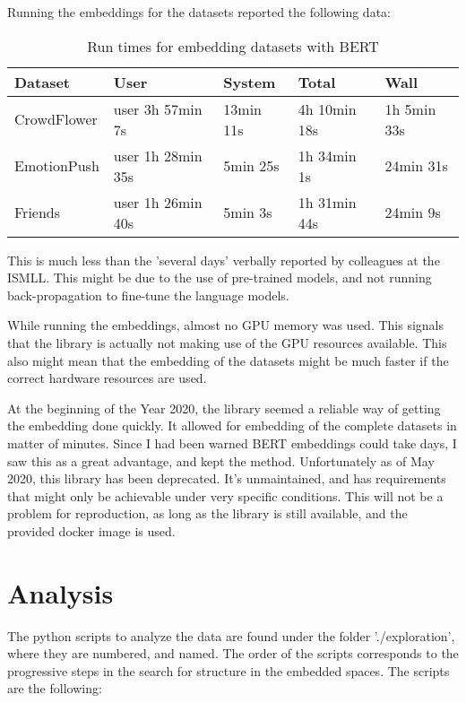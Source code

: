Running the embeddings for the datasets reported the following data:

\begin{table}[H]
  \begin{tabular}{lllll}
  Dataset                          & User              & System    & Total        & Wall        \\
  \hline
  \multicolumn{1}{l|}{CrowdFlower} & user 3h 57min 7s  & 13min 11s & 4h 10min 18s & 1h 5min 33s \\
  \multicolumn{1}{l|}{EmotionPush} & user 1h 28min 35s & 5min 25s  & 1h 34min 1s &  24min 31s   \\
  \multicolumn{1}{l|}{Friends    } & user 1h 26min 40s & 5min 3s   & 1h 31min 44s & 24min 9s
  \end{tabular}
  \caption{Run times for embedding datasets with BERT}\label{tab:rt_BERT}
\end{table}

This is much less than the 'several days' verbally reported by colleagues at the ISMLL. This might be due to the use of pre-trained models, and not running back-propagation to fine-tune the language models.

While running the embeddings, almost no GPU memory was used. This signals that the library is actually not making use of the GPU resources available. This also might mean that the embedding of the datasets might be much faster if the correct hardware resources are used.

At the beginning of the Year 2020, the library seemed a reliable way of getting the embedding done quickly. It allowed for embedding of the complete datasets in matter of minutes. Since I had been warned BERT embeddings could take days, I saw this as a great advantage, and kept the method. Unfortunately as of May 2020, this library has been deprecated. It's unmaintained, and has requirements that might only be achievable under very specific conditions. This will not be a problem for reproduction, as long as the library is still available, and the provided docker image is used.

\section{Analysis}\label{sec:Analysis}
The python scripts to analyze the data are found under the folder './exploration', where they are numbered, and named. The order of the scripts corresponds to the progressive steps in the search for structure in the embedded spaces. The scripts are the following:

